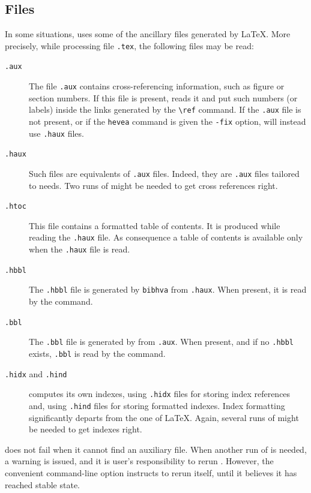 \subsection{\label{files}Files}
In some situations,
\hevea{} uses some of the ancillary files generated by \LaTeX.
More precisely, while processing file \texttt{.tex},
the following files may be read:
\begin{description}
\item[\protect\texttt{.aux}] The file \texttt{.aux} contains
cross-referencing information, such as figure or section numbers.
If this file is present, \hevea{} reads it and put such numbers (or
labels) inside
the links generated by the \verb+\ref+ command. If the \texttt{.aux}
file is not present, or if the \texttt{hevea} command is given the
\texttt{-fix} option, \hevea{} will instead use \texttt{.haux}
files.
\item[\protect\texttt{.haux}] Such files are \hevea{} equivalents of
\texttt{.aux} files. Indeed, they are \texttt{.aux} files tailored to
\hevea{} needs.
Two runs of \hevea{} might be needed to get cross references right.
\item[\protect\texttt{.htoc}] This file contains a formatted table of
contents. It is produced while reading the \texttt{.haux} file.
As consequence a table of contents is available only when the
\texttt{.haux} file is read.


\item[\protect\texttt{.hbbl}] The \texttt{.hbbl} file
is generated by \texttt{bibhva} from \texttt{.haux}.
When present, it is read by the \verb++ command.

\item[\protect\texttt{.bbl}] The \texttt{.bbl} file is
generated by \BibTeX{} from \texttt{.aux}.
When present, and if no \texttt{.hbbl} exists,
\texttt{.bbl} is read by the \verb++ command.

\item[\protect\texttt{.hidx} and \protect\texttt{.hind}]
\hevea{} computes its own indexes, using \texttt{.hidx} files for
storing index references and, using \texttt{.hind} files
for storing formatted indexes.
Index formatting significantly departs from the one of \LaTeX{}.
Again, several runs of \hevea{} might be needed to get indexes right.
\end{description}

\noindent\hevea{} does not fail when it cannot find an auxiliary file.
When another run of \hevea{} is needed, a warning is issued,
and it is user's responsibility to rerun \hevea{}.
However, the convenient  command-line option instructs
\hevea{} to rerun itself, until it believes it has reached stable state.

